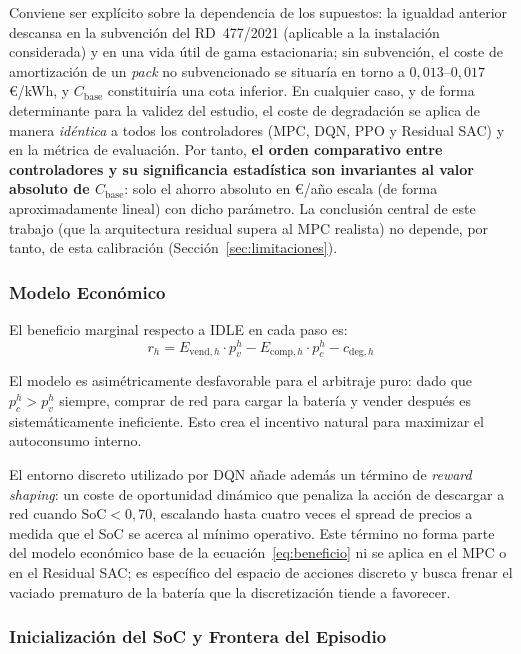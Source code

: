 \documentclass[12pt, a4paper, twoside]{report}
\begin{document}
Conviene ser explícito sobre la dependencia de los supuestos: la igualdad anterior
descansa en la subvención del RD~477/2021 (aplicable a la instalación
considerada) y en una vida útil de gama estacionaria; sin subvención, el coste de
amortización de un \emph{pack} no subvencionado se situaría en torno a
$0{,}013\text{--}0{,}017$\,€/kWh, y $C_{\text{base}}$ constituiría una cota
inferior. En cualquier caso, y de forma determinante para la validez del estudio,
el coste de degradación se aplica de manera \emph{idéntica} a todos los
controladores (MPC, DQN, PPO y Residual SAC) y en la métrica de evaluación. Por
tanto, \textbf{el orden comparativo entre controladores y su significancia
estadística son invariantes al valor absoluto de $C_{\text{base}}$}: solo el ahorro
absoluto en €/año escala (de forma aproximadamente lineal) con dicho parámetro. La
conclusión central de este trabajo (que la arquitectura residual supera al MPC
realista) no depende, por tanto, de esta calibración
(Sección~\ref{sec:limitaciones}).

\subsubsection{Modelo Económico}

El beneficio marginal respecto a IDLE en cada paso es:
\begin{equation}
  r_h = E_{\text{vend},h} \cdot p_v^h - E_{\text{comp},h} \cdot p_c^h
        - c_{\text{deg},h}
  \label{eq:beneficio}
\end{equation}

El modelo es asimétricamente desfavorable para el arbitraje puro: dado que
$p_c^h > p_v^h$ siempre, comprar de red para cargar la batería y vender
después es sistemáticamente ineficiente. Esto crea el incentivo natural para
maximizar el autoconsumo interno.

El entorno discreto utilizado por DQN añade además un término de
\textit{reward shaping}: un coste de oportunidad dinámico que penaliza la
acción de descargar a red cuando $\text{SoC} < 0{,}70$, escalando hasta cuatro
veces el spread de precios a medida que el SoC se acerca al mínimo operativo.
Este término no forma parte del modelo económico base de la
ecuación~\eqref{eq:beneficio} ni se aplica en el MPC o en el Residual SAC; es
específico del espacio de acciones discreto y busca frenar el vaciado
prematuro de la batería que la discretización tiende a favorecer.

\subsubsection{Inicialización del SoC y Frontera del Episodio}
\end{document}
